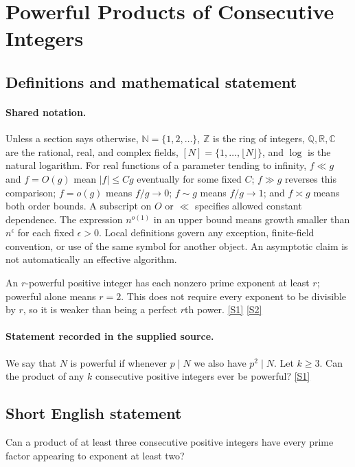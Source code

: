 \documentclass[11pt,a4paper]{article}
\newcommand{\N}{\mathbb{N}}
\newcommand{\Z}{\mathbb{Z}}
\newcommand{\Q}{\mathbb{Q}}
\newcommand{\R}{\mathbb{R}}
\newcommand{\C}{\mathbb{C}}
\newcommand{\sref}[2]{\hyperlink{source:#1:#2}{[S#2]}}
\begin{document}
\section{Powerful Products of Consecutive Integers}\label{statement}


\subsection{Definitions and mathematical statement}

\paragraph{Shared notation.}Unless a section says otherwise, $\N=\{1,2,\ldots\}$,
$\Z$ is the ring of integers, $\Q,\R,\C$ are the rational, real, and complex
fields, $[N]=\{1,\ldots,\lfloor N\rfloor\}$, and $\log$ is the natural
logarithm. For real functions of a parameter tending to infinity,
$f\ll g$ and $f=O(g)$ mean $|f|\leq Cg$ eventually for some fixed $C$;
$f\gg g$ reverses this comparison; $f=o(g)$ means $f/g\to0$;
$f\sim g$ means $f/g\to1$; and $f\asymp g$ means both order bounds.
A subscript on $O$ or $\ll$ specifies allowed constant dependence.
The expression $n^{o(1)}$ in an upper bound means growth smaller than
$n^\epsilon$ for each fixed $\epsilon>0$. Local definitions govern any
exception, finite-field convention, or use of the same symbol for another
object. An asymptotic claim is not automatically an effective algorithm.



An $r$-powerful positive integer has each nonzero prime exponent at least $r$; powerful alone means $r=2$. This does not require every exponent to be divisible by $r$, so it is weaker than being a perfect $r$th power. \sref{statement}{1} \sref{statement}{2}

\paragraph{Statement recorded in the supplied source.}
We say that $N$ is powerful if whenever $p\mid N$ we also have $p^2\mid N$. Let $k\geq 3$. Can the product of any $k$ consecutive positive integers ever be powerful? \sref{statement}{1}

\subsection{Short English statement}

Can a product of at least three consecutive positive integers have every prime factor appearing to exponent at least two?
\end{document}
